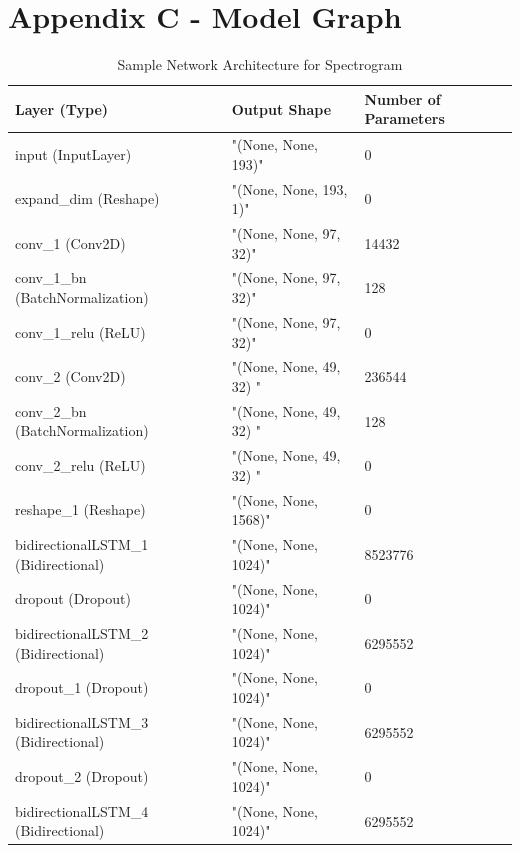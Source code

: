 
\chapter{Appendix C - Model Graph} %

\label{AppendixC} %

\begin{table}[!ht]
    \centering
    \caption{Sample Network Architecture for Spectrogram}
    \begin{tabular}{|l|l|l|}
    \hline
        \textbf{Layer (Type)} & \textbf{Output Shape} & \textbf{Number of Parameters} \\ \hline
        input (InputLayer) & "(None, None, 193)" & 0 \\ \hline
        expand\_dim (Reshape) & "(None, None, 193, 1)" & 0 \\ \hline
        conv\_1 (Conv2D) & "(None, None, 97, 32)" & 14432 \\ \hline
        conv\_1\_bn (BatchNormalization) & "(None, None, 97, 32)" & 128 \\ \hline
        conv\_1\_relu (ReLU) & "(None, None, 97, 32)" & 0 \\ \hline
        conv\_2 (Conv2D) & "(None, None, 49, 32)  " & 236544 \\ \hline
        conv\_2\_bn (BatchNormalization) & "(None, None, 49, 32)  " & 128 \\ \hline
        conv\_2\_relu (ReLU) & "(None, None, 49, 32)  " & 0 \\ \hline
        reshape\_1 (Reshape) & "(None, None, 1568)" & 0 \\ \hline
        bidirectionalLSTM\_1 (Bidirectional) & "(None, None, 1024)" & 8523776 \\ \hline
        dropout (Dropout) & "(None, None, 1024)" & 0 \\ \hline
        bidirectionalLSTM\_2 (Bidirectional) & "(None, None, 1024)" & 6295552 \\ \hline
        dropout\_1 (Dropout) & "(None, None, 1024)" & 0 \\ \hline
        bidirectionalLSTM\_3 (Bidirectional) & "(None, None, 1024)" & 6295552 \\ \hline
        dropout\_2 (Dropout) & "(None, None, 1024)" & 0 \\ \hline
        bidirectionalLSTM\_4 (Bidirectional) & "(None, None, 1024)" & 6295552 \\ \hline

\end{tabular}
\end{table}
